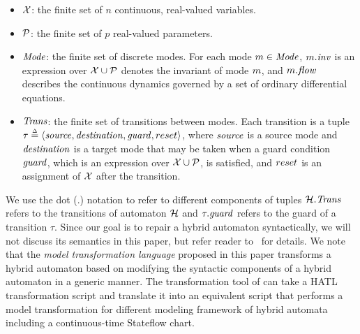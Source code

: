 %
\begin{itemize}[leftmargin= 2em]
%
\item $\X$: the finite set of $n$ continuous, real-valued variables. 
\item $\P$: the finite set of $p$ real-valued parameters.
\item $\Locset$: the finite set of discrete modes. For each mode $\mode \in \Locset$, $\mode.\inveg$ is an expression over $\X \cup \P$ denotes the invariant of mode $\mode$, and $\mode.\floweg$ describes the continuous dynamics governed by a set of ordinary differential equations. %
\item $\Transset$: the finite set of transitions between modes. Each transition is a tuple $\tau \deq \tuple{\src, \dst, \guard, \reset}$, where $\src$ is a source mode and $\dst$ is a target mode that may be taken when a guard condition $\guard$, which is an expression over $\X \cup \P$, is satisfied, and $\reset$ is an assignment of $\X$ after the transition. 
%
%
\end{itemize}
%
We use the dot (.) notation to refer to different components of tuples \eg $\AutomatonH.\Transset$ refers to the transitions of automaton $\AutomatonH$ and $\tau.\guard$ refers to the guard of a transition $\tau$. Since our goal is to repair a hybrid automaton syntactically, we will not discuss its semantics in this paper, but refer reader to~\cite{alur1995algorithmic} for details. 
%
We note that the \emph{model transformation language} proposed in this paper transforms a hybrid automaton based on modifying the syntactic components of a hybrid automaton in a generic manner. 
%
The transformation tool of \toolreaffirm can take a HATL transformation script and translate it into an equivalent script that performs a model transformation for different modeling framework of hybrid automata including a continuous-time Stateflow chart.
%

